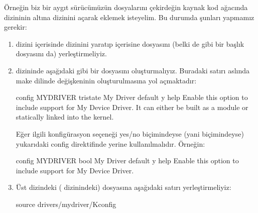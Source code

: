\documentclass[a4paper,10pt,turkish]{sphinxmanual}
\begin{document}
\sphinxAtStartPar
Örneğin biz bir aygıt sürücümüzün dosyalarını çekirdeğin kaynak kod ağacında  dizininin
altına  dizinini açarak eklemek isteyelim. Bu durumda şunları yapmamız gerekir:
\begin{enumerate}
%
\item {} 
\sphinxAtStartPar
{} dizini içerisinde  dizinini yaratıp içerisine  dosyasını
(belki de  gibi bir başlık dosyasını da) yerleştirmeliyiz.

\item {} 
\sphinxAtStartPar
{} dizininde aşağıdaki gibi bir  dosyasını oluşturmalıyız. Buradaki
 satırı aslında make dilinde  değişkeninin oluşturulmasına yol
açmaktadır:

\begin{sphinxVerbatim}[commandchars=\\\{\}]
config MYDRIVER
    tristate \PYGZdq{}My Driver\PYGZdq{}
    default y
    help
      Enable this option to include support for My Device Driver.
      It can either be built as a module or statically linked into the kernel.
\end{sphinxVerbatim}

\sphinxAtStartPar
Eğer ilgili konfigürasyon seçeneği yes/no biçimindeyse (yani \sphinxcode{\sphinxupquote{{[}*{]}}} biçimindeyse) yukarıdaki config
direktifinde  yerine  kullanılmalıdır. Örneğin:

\begin{sphinxVerbatim}[commandchars=\\\{\}]
config MYDRIVER
    bool \PYGZdq{}My Driver\PYGZdq{}
    default y
    help
      Enable this option to include support for My Device Driver.
\end{sphinxVerbatim}

\item {} 
\sphinxAtStartPar
Üst dizindeki ( dizinindeki)  dosyasına aşağıdaki satırı yerleştirmeliyiz:

\begin{sphinxVerbatim}[commandchars=\\\{\}]
source \PYGZdq{}drivers/mydriver/Kconfig\PYGZdq{}
\end{sphinxVerbatim}


\end{enumerate}
\end{document}

